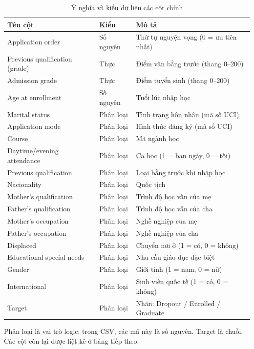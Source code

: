 \begin{table}[H]\centering\small
\caption{Ý nghĩa và kiểu dữ liệu các cột chính}\label{tab:columns}
\begin{tabular}{>{\raggedright\arraybackslash}p{5.2cm}>{\raggedright\arraybackslash}p{2cm}>{\raggedright\arraybackslash}p{5.8cm}}\toprule
Tên cột & Kiểu & Mô tả\\\midrule
Application order & Số nguyên & Thứ tự nguyện vọng (0 = ưu tiên nhất)\\
Previous qualification (grade) & Thực & Điểm văn bằng trước (thang 0–200)\\
Admission grade & Thực & Điểm tuyển sinh (thang 0–200)\\
Age at enrollment & Số nguyên & Tuổi lúc nhập học\\
Marital status & Phân loại & Tình trạng hôn nhân (mã số UCI)\\
Application mode & Phân loại & Hình thức đăng ký (mã số UCI)\\
Course & Phân loại & Mã ngành học\\
Daytime/evening attendance & Phân loại & Ca học (1 = ban ngày, 0 = tối)\\
Previous qualification & Phân loại & Loại bằng trước khi nhập học\\
Nacionality & Phân loại & Quốc tịch\\
Mother's qualification & Phân loại & Trình độ học vấn của mẹ\\
Father's qualification & Phân loại & Trình độ học vấn của cha\\
Mother's occupation & Phân loại & Nghề nghiệp của mẹ\\
Father's occupation & Phân loại & Nghề nghiệp của cha\\
Displaced & Phân loại & Chuyển nơi ở (1 = có, 0 = không)\\
Educational special needs & Phân loại & Nhu cầu giáo dục đặc biệt\\
Gender & Phân loại & Giới tính (1 = nam, 0 = nữ)\\
International & Phân loại & Sinh viên quốc tế (1 = có, 0 = không)\\\midrule
Target & Phân loại & Nhãn: Dropout / Enrolled / Graduate\\\bottomrule
\end{tabular}
\par\smallskip\small Phân loại là vai trò logic; trong CSV, các mã này là số nguyên. Target là chuỗi. Các cột còn lại được liệt kê ở bảng tiếp theo.\normalsize
\end{table}

